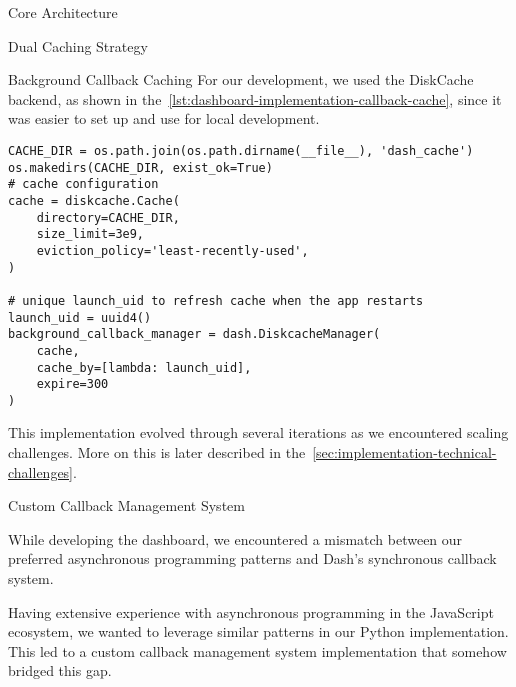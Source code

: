 \begin{section}{Core Architecture}
\begin{subsection}{Dual Caching Strategy}
\begin{subsubsection}{Background Callback Caching}
			For our development, we used the DiskCache backend, as shown in the~\autoref{lst:dashboard-implementation-callback-cache}, since it was easier to set up and use for local development.

			\begin{listing}[H]
				\caption{DiskCache Background Callback Manager Setup}
				\begin{verbatim}
CACHE_DIR = os.path.join(os.path.dirname(__file__), 'dash_cache')
os.makedirs(CACHE_DIR, exist_ok=True)
# cache configuration
cache = diskcache.Cache(
	directory=CACHE_DIR,
	size_limit=3e9,
	eviction_policy='least-recently-used',
)

# unique launch_uid to refresh cache when the app restarts
launch_uid = uuid4()
background_callback_manager = dash.DiskcacheManager(
	cache,
	cache_by=[lambda: launch_uid],
	expire=300
)
				\end{verbatim}
				\label{lst:dashboard-implementation-callback-cache}
			\end{listing}

			This implementation evolved through several iterations as we encountered scaling challenges.
			More on this is later described in the~\autoref{sec:implementation-technical-challenges}.
		\end{subsubsection}
	\end{subsection}

	\begin{subsection}{Custom Callback Management System}
		\label{subsec:implementation-core-architecture-callbacks}

		While developing the dashboard, we encountered a mismatch between our preferred asynchronous programming patterns and Dash's synchronous callback system.

		Having extensive experience with asynchronous programming in the JavaScript ecosystem, we wanted to leverage similar patterns in our Python implementation.
		This led to a custom callback management system implementation that somehow bridged this gap.


\end{subsection}
\end{section}
